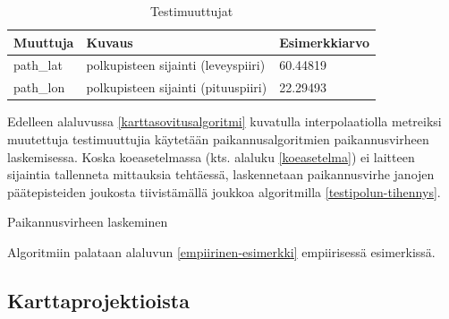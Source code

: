 \documentclass[
  12pt,
  a4paper, twoside]{book}
\begin{document}
\def\arraystretch{1.25} 
\begin{table}[H]
\centering
\begin{tabular}{|l|l|l|}
\hline
Muuttuja & Kuvaus & Esimerkkiarvo\\
\hline
path\_lat & polkupisteen sijainti (leveyspiiri) & 60.44819 \\
path\_lon & polkupisteen sijainti (pituuspiiri) & 22.29493 \\
\hline
\end{tabular}
\caption{Testimuuttujat}
\label{tab:testimuuttujat}
\end{table}

\noindent Edelleen alaluvussa \ref{karttasovitusalgoritmi} kuvatulla interpolaatiolla metreiksi muutettuja testimuuttujia käytetään paikannusalgoritmien paikannusvirheen laskemisessa. Koska koeasetelmassa (kts. alaluku \ref{koeasetelma}) ei laitteen sijaintia tallenneta mittauksia tehtäessä, laskennetaan paikannusvirhe janojen päätepisteiden joukosta tiivistämällä joukkoa algoritmilla \ref{testipolun-tihennys}.

\begin{algorithm}[H]
\label{testipolun-tihennys}
\DontPrintSemicolon
\SetAlgoShortEnd
{}
\caption{Paikannusvirheen laskeminen}
\end{algorithm}

Algoritmiin palataan alaluvun \ref{empiirinen-esimerkki} empiirisessä esimerkissä.

\subsection{Karttaprojektioista} \label{karttaprojektioista}
\end{document}
